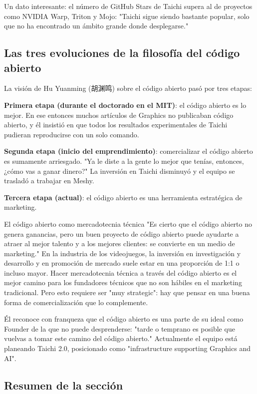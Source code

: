 \documentclass[a4paper]{article}
\begin{document}
Un dato interesante: el número de GitHub Stars de Taichi supera al de proyectos como NVIDIA Warp, Triton y Mojo: "Taichi sigue siendo bastante popular, solo que no ha encontrado un ámbito grande donde desplegarse."

\subsection{Las tres evoluciones de la filosofía del código abierto}

La visión de Hu Yuanming (胡渊鸣) sobre el código abierto pasó por tres etapas:

\textbf{Primera etapa (durante el doctorado en el MIT)}: el código abierto es lo mejor. En ese entonces muchos artículos de Graphics no publicaban código abierto, y él insistió en que todos los resultados experimentales de Taichi pudieran reproducirse con un solo comando.

\textbf{Segunda etapa (inicio del emprendimiento)}: comercializar el código abierto es sumamente arriesgado. "Ya le diste a la gente lo mejor que tenías, entonces, ¿cómo vas a ganar dinero?" La inversión en Taichi disminuyó y el equipo se trasladó a trabajar en Meshy.

\textbf{Tercera etapa (actual)}: el código abierto es una herramienta estratégica de marketing.

\begin{importantbox}{El código abierto como mercadotecnia técnica}
"Es cierto que el código abierto no genera ganancias, pero un buen proyecto de código abierto puede ayudarte a atraer al mejor talento y a los mejores clientes: se convierte en un medio de marketing." En la industria de los videojuegos, la inversión en investigación y desarrollo y en promoción de mercado suele estar en una proporción de 1:1 o incluso mayor. Hacer mercadotecnia técnica a través del código abierto es el mejor camino para los fundadores técnicos que no son hábiles en el marketing tradicional. Pero esto requiere ser "muy strategic": hay que pensar en una buena forma de comercialización que lo complemente.
\end{importantbox}

Él reconoce con franqueza que el código abierto es una parte de su ideal como Founder de la que no puede desprenderse: "tarde o temprano es posible que vuelvas a tomar este camino del código abierto." Actualmente el equipo está planeando Taichi 2.0, posicionado como "infrastructure supporting Graphics and AI".

\subsection{Resumen de la sección}
\end{document}
